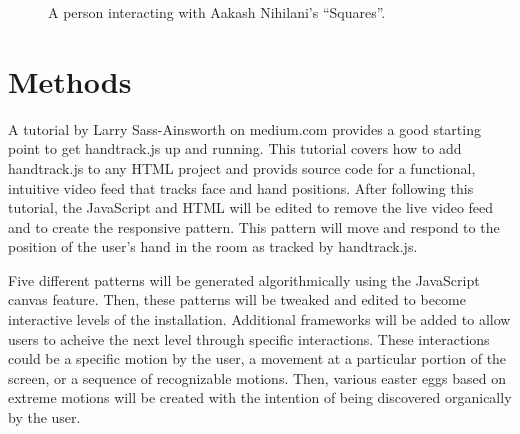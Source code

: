 \documentclass[10pt,twocolumn]{article}
\begin{document}
\begin{figure}[hbh]
\begin{center}
\vspace{.5cm}
\caption{A person interacting with Aakash Nihilani's ``Squares''. }
\label{fig:shadow-2002}
\end{center}
\end{figure} 

\section{Methods}
 A tutorial by Larry Sass-Ainsworth on medium.com \cite{sass-ainsworth_getting_2019} provides a good starting point to get handtrack.js up and running.  This tutorial covers how to add handtrack.js to any HTML project and provids source code for a functional, intuitive video feed that tracks face and hand positions. After following this tutorial, the JavaScript and HTML will be edited to remove the live video feed and to create the responsive pattern.  This pattern will move and respond to the position of the user's hand in the room as tracked by handtrack.js. 
 
Five different patterns will be generated algorithmically using the JavaScript canvas feature. Then, these patterns will be tweaked and edited to become interactive levels of the installation.  Additional frameworks will be added to allow users to acheive the next level through specific interactions.  These interactions could be a specific motion by the user, a movement at a particular portion of the screen, or a sequence of recognizable motions.  Then, various easter eggs based on extreme motions will be created with the intention of being discovered organically by the user. 
\end{document}
